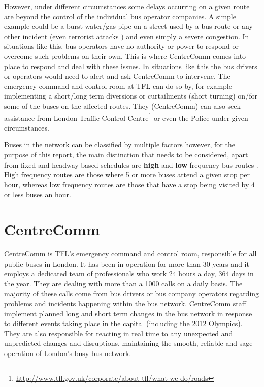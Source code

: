 However, under different circumstances some delays occurring on a given route are beyond the control of the individual bus operator companies. A simple example could be a burst water/gas pipe on a street used by a bus route or any other incident (even terrorist attacks \cite{centreComm}) and even simply a severe congestion. In situations like this, bus operators have no authority or power to respond or overcome such problems on their own. This is where CentreComm comes into place to respond and deal with these issues. In situations like this the bus drivers or operators would need to alert and ask CentreComm to intervene. The emergency command and control room at TFL can do so by, for example implementing a short/long term diversions or curtailments (short turning) on/for some of the buses on the affected routes. They (CentreComm) can also seek assistance from London Traffic Control Centre\footnote{\url{http://www.tfl.gov.uk/corporate/about-tfl/what-we-do/roads}} or even the Police under given circumstances.

Buses in the network can be classified by multiple factors however, for the purpose of this report, the main distinction that needs to be considered, apart from fixed and headway based schedules are \textbf{high} and \textbf{low} frequency bus routes \cite{busTendering}. High frequency routes are those where 5 or more buses attend a given stop per hour, whereas low frequency routes are those that have a stop being visited by 4 or less buses an hour.

\section{CentreComm}
CentreComm is TFL's emergency command and control room, responsible for all public buses in London. It has been in operation for more than 30 years \cite{centreComm} and it employs a dedicated team of professionals who work 24 hours a day, 364 days in the year. They are dealing with more than a 1000 calls on a daily basis. The majority of these calls come from bus drivers or bus company operators regarding problems and incidents happening within the bus network. CentreComm staff implement planned long and short term changes in the bus network in response to different events taking place in the capital (including the 2012 Olympics). They are also responsible for reacting in real time to any unexpected and unpredicted changes and disruptions, maintaining the smooth, reliable and sage operation of London's busy bus network.

